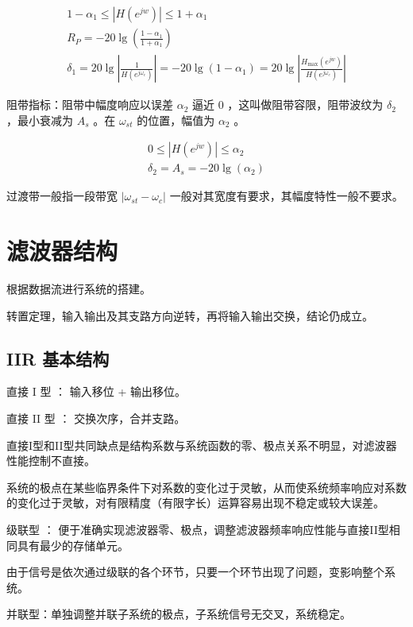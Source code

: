\documentclass[cn,11pt,chinese,black,simple]{elegantbook}
\begin{document}
\[
\begin{array}{l}
1-\alpha_{1} \leq\left|H\left(e^{j w}\right)\right| \leq 1+\alpha_{1} \\
R_{P}=-20 \lg \left(\frac{1-\alpha_{1}}{1+\alpha_{1}}\right) \\
\delta_{1}=20 \lg \left|\frac{1}{H\left(e^{j \omega_{c}}\right)}\right|=-20 \lg \left(1-\alpha_{1}\right)=20 \lg \left|\frac{H_{\max }\left(e^{j w}\right)}{H\left(e^{j \omega_{c}}\right)}\right|
\end{array}
\]

阻带指标：阻带中幅度响应以误差 \(\alpha_2\) 逼近 \(0\) ，这叫做阻带容限，阻带波纹为 \(\delta_2\) ，最小衰减为 \(A_s\) 。在 \(\omega_{st}\) 的位置，幅值为 \(\alpha_2\) 。

\[
\begin{array}{l}
0 \leq\left|H\left(e^{j w}\right)\right| \leq \alpha_{2} \\
\delta_{2}=A_{s}=-20 \lg \left(\alpha_{2}\right)
\end{array}
\]

过渡带一般指一段带宽 \(|\omega_{st} - \omega_c|\) 一般对其宽度有要求，其幅度特性一般不要求。


\section{滤波器结构}

根据数据流进行系统的搭建。

转置定理，输入输出及其支路方向逆转，再将输入输出交换，结论仍成立。

\subsection{IIR 基本结构}

{直接 I 型} ： 输入移位 + 输出移位。

直接 II 型 ： 交换次序，合并支路。

直接I型和II型共同缺点是结构系数与系统函数的零、极点关系不明显，对滤波器性能控制不直接。

系统的极点在某些临界条件下对系数的变化过于灵敏，从而使系统频率响应对系数的变化过于灵敏，对有限精度（有限字长）运算容易出现不稳定或较大误差。

级联型 ： 便于准确实现滤波器零、极点，调整滤波器频率响应性能与直接II型相同具有最少的存储单元。

由于信号是依次通过级联的各个环节，只要一个环节出现了问题，变影响整个系统。

并联型：单独调整并联子系统的极点，子系统信号无交叉，系统稳定。
\end{document}

